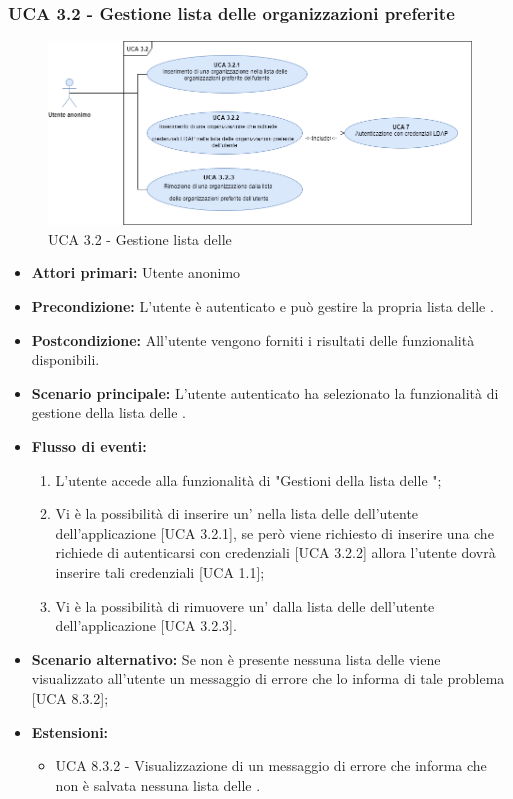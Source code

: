 \subsubsection{UCA 3.2 - Gestione lista delle organizzazioni preferite}%
\begin{figure}[h]
	\centering
	\includegraphics[scale=0.45 , center]{Sezioni/UseCase/Immagini/UCA3.2.png}
	\caption{UCA 3.2 - Gestione lista delle }
\end{figure}
\begin{itemize}
	\item \textbf{Attori primari:} Utente anonimo
	\item \textbf{Precondizione:} L'utente è autenticato e può gestire la propria lista delle .
	\item \textbf{Postcondizione:} All'utente vengono forniti i risultati delle funzionalità disponibili.
	\item \textbf{Scenario principale:} L'utente autenticato ha selezionato la funzionalità di gestione della lista delle .
	\item \textbf{Flusso di eventi:}
			\begin{enumerate}
			\item L'utente accede alla funzionalità di "Gestioni della lista delle ";
			\item Vi è la possibilità di inserire un' nella lista delle  dell'utente dell'applicazione [UCA 3.2.1], se però viene richiesto di inserire una  che richiede di autenticarsi con credenziali  [UCA 3.2.2] allora l'utente dovrà inserire tali credenziali [UCA 1.1];
			\item Vi è la possibilità di rimuovere un' dalla lista delle  dell'utente dell'applicazione [UCA 3.2.3].
			\end{enumerate}
	\item \textbf{Scenario alternativo:} Se non è presente nessuna lista delle  viene visualizzato all'utente un messaggio di errore che lo informa di tale problema [UCA 8.3.2];
	\item \textbf{Estensioni:}
	\begin{itemize}
		\item UCA 8.3.2 - Visualizzazione di un messaggio di errore che informa che non è salvata nessuna lista delle .
	\end{itemize}
\end{itemize}

